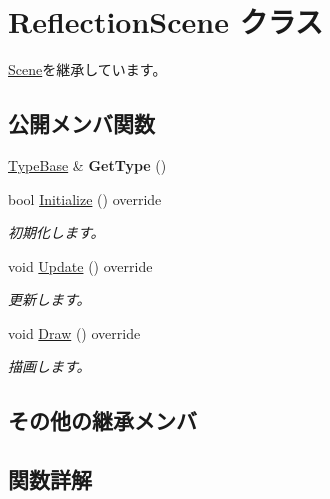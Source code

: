 \hypertarget{class_reflection_scene}{}\section{Reflection\+Scene クラス}
\label{class_reflection_scene}


\hyperlink{class_scene}{Scene}を継承しています。

\subsection*{公開メンバ関数}
\begin{DoxyCompactItemize}
\item 
\hyperlink{class_reflection_1_1_type_base}{Type\+Base} \& {\bfseries Get\+Type} ()\hypertarget{class_reflection_scene_aaba779558e05b1c1768f65b56c2d6e34}{}\label{class_reflection_scene_aaba779558e05b1c1768f65b56c2d6e34}

\item 
bool \hyperlink{class_reflection_scene_a4e6f3640b5dac3088d7f4772ebd46b87}{Initialize} () override
\begin{DoxyCompactList}\small\item\em 初期化します。\end{DoxyCompactList}\item 
void \hyperlink{class_reflection_scene_a3ff59b41aab3ad8a483fc516f59a4de5}{Update} () override
\begin{DoxyCompactList}\small\item\em 更新します。\end{DoxyCompactList}\item 
void \hyperlink{class_reflection_scene_ae749304efc77f6004e23a25f33816e95}{Draw} () override
\begin{DoxyCompactList}\small\item\em 描画します。\end{DoxyCompactList}\end{DoxyCompactItemize}
\subsection*{その他の継承メンバ}


\subsection{関数詳解}
